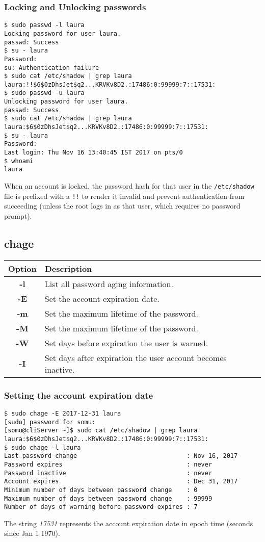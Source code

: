 \subsubsection{Locking and Unlocking passwords}
\vspace{-10pt}
\begin{verbatim}
$ sudo passwd -l laura
Locking password for user laura.
passwd: Success
$ su - laura
Password: 
su: Authentication failure
$ sudo cat /etc/shadow | grep laura
laura:!!$6$0zDhsJet$q2...KRVKv8D2.:17486:0:99999:7::17531:
$ sudo passwd -u laura
Unlocking password for user laura.
passwd: Success
$ sudo cat /etc/shadow | grep laura
laura:$6$0zDhsJet$q2...KRVKv8D2.:17486:0:99999:7::17531:
$ su - laura
Password: 
Last login: Thu Nov 16 13:40:45 IST 2017 on pts/0
$ whoami
laura
\end{verbatim}

\noindent
When an account is locked, the password hash for that user in the \verb|/etc/shadow| file is prefixed with a \verb|!!| to render it invalid and prevent authentication from succeeding (unless the root logs in as that user, which requires no password prompt).	

\subsection{chage}
\begin{tabular}{cl}
	\toprule
	\textbf{Option} &\textbf{Description} \\
	\midrule
	\textbf{-l} &List all password aging information. \\	
	\textbf{-E} &Set the account expiration date. \\	\textbf{-m} &Set the maximum lifetime of the password. \\
	\textbf{-M} &Set the maximum lifetime of the password. \\
	\textbf{-W} &Set days before expiration the user is warned. \\ 
	\textbf{-I} &Set days after expiration the user account becomes inactive. \\
	\bottomrule
\end{tabular}

\subsubsection{Setting the account expiration date}
\vspace{-10pt}
\begin{verbatim}
$ sudo chage -E 2017-12-31 laura
[sudo] password for somu: 
[somu@cliServer ~]$ sudo cat /etc/shadow | grep laura
laura:$6$0zDhsJet$q2...KRVKv8D2.:17486:0:99999:7::17531:
$ sudo chage -l laura
Last password change                              : Nov 16, 2017
Password expires                                  : never
Password inactive                                 : never
Account expires                                   : Dec 31, 2017
Minimum number of days between password change    : 0
Maximum number of days between password change    : 99999
Number of days of warning before password expires : 7
\end{verbatim}
The string \textit{17531} represents the account expiration date in epoch time (seconds since Jan 1 1970).